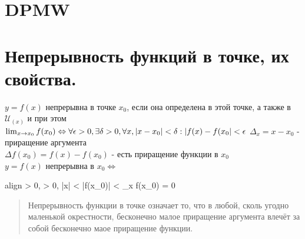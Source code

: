 \documentclass[oneside]{book}
\newcommand{\boxedeq}[2]{\begin{empheq}[box={\fboxsep=6pt\fbox}]{align}\label{#1}#2\end{empheq}}
\begin{document}
\begin{enumerate}
\chapter{DPMW}
\pagebreak

\chapter[Непрерывность]{Непрерывность функций в точке, их свойства.}
$y = f(x)$ непрерывна в точке $x_0$, если она определена в этой точке, а также в $\mathcal{U}_{(x)}$ и при этом
$\lim_{x \rightarrow x_0}{f(x_0) \Leftrightarrow \\ \forall \epsilon > 0, \exists \delta > 0, \forall x, |x - x_0|
< \delta : |f(x) - f(x_0| < \epsilon }$
$\Delta_x = x-x_0$ - приращение аргумента \\
$\Delta f(x_0) = f(x) - f(x_0)$ - есть приращение функции в $x_0$ \\
$y = f(x)$ непрерывна в $x_0 \Leftrightarrow$
\boxedeq{eq:*}{
    \forall \epsilon > 0, \exists \delta > 0, |\Delta x| < \delta \Rightarrow |\Delta f(x_0)|
    < \epsilon \Leftrightarrow \lim_{\Delta x \rightarrow 0}{\Delta f(x_0)} = 0
}
\begin{quote}
    Непрерывность функции в точке означает то, что в любой, сколь угодно маленькой окрестности, бесконечно малое приращение аргумента
    влечёт за собой бесконечно маое приращение функции.
\end{quote}


\end{enumerate}
\end{document}
